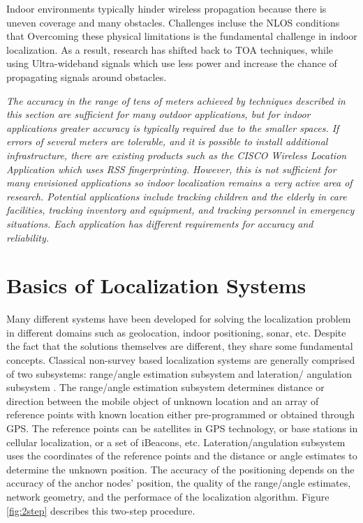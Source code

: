 Indoor environments typically hinder wireless propagation because there is uneven coverage and many obstacles. Challenges incluse the NLOS conditions that 
 Overcoming these physical limitations is the fundamental challenge in indoor localization. As a result, research has shifted back to TOA techniques, while using Ultra-wideband signals which use less power and increase the chance of propagating signals around obstacles.

\textit{The accuracy in the range of tens of meters achieved by techniques described in this section are sufficient for many outdoor applications, but for indoor applications greater accuracy is typically required due to the smaller spaces. If errors of several meters are tolerable, and it is possible to install additional infrastructure, there are existing products such as the CISCO Wireless Location Application \cite{CiscoWLA} which uses RSS fingerprinting. However, this is not sufficient for many envisioned applications so indoor localization remains a very active area of research. Potential applications include tracking children and the elderly in care facilities, tracking inventory and equipment, and tracking personnel in emergency situations. Each application has different requirements for accuracy and reliability.}





\section{Basics of Localization Systems}

Many different systems have been developed for solving the localization problem in different domains such as geolocation, indoor positioning, sonar, etc. Despite the fact that the  solutions themselves are different, they share some fundamental concepts. Classical non-survey based localization systems  are generally comprised of two subsystems: range/angle estimation subsystem and lateration/
angulation subsystem \cite{GeoLoc}. The range/angle estimation subsystem determines distance or direction between the  mobile object of unknown location  and an array of reference points with known location  either pre-programmed or obtained through GPS.  The reference points can be satellites in GPS technology, or base stations in cellular localization, or a set of iBeacons, etc. Lateration/angulation subsystem uses the coordinates of the reference points and the distance or angle estimates to determine the unknown position.  The accuracy of the positioning depends on the accuracy of the anchor nodes’ position, the quality of the range/angle estimates, network geometry, and the performace of the localization algorithm. Figure \ref{fig:2step} describes this two-step procedure.


